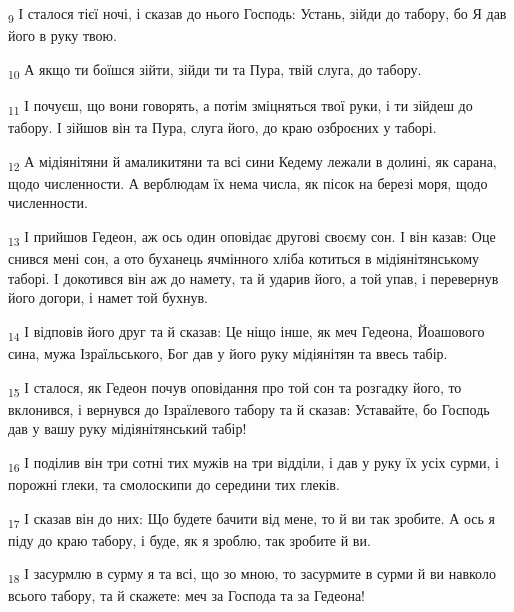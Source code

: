 \begin{tcolorbox}
\textsubscript{9} І сталося тієї ночі, і сказав до нього Господь: Устань, зійди до табору, бо Я дав його в руку твою.
\end{tcolorbox}
\begin{tcolorbox}
\textsubscript{10} А якщо ти боїшся зійти, зійди ти та Пура, твій слуга, до табору.
\end{tcolorbox}
\begin{tcolorbox}
\textsubscript{11} І почуєш, що вони говорять, а потім зміцняться твої руки, і ти зійдеш до табору. І зійшов він та Пура, слуга його, до краю озброєних у таборі.
\end{tcolorbox}
\begin{tcolorbox}
\textsubscript{12} А мідіянітяни й амаликитяни та всі сини Кедему лежали в долині, як сарана, щодо численности. А верблюдам їх нема числа, як пісок на березі моря, щодо численности.
\end{tcolorbox}
\begin{tcolorbox}
\textsubscript{13} І прийшов Гедеон, аж ось один оповідає другові своєму сон. І він казав: Оце снився мені сон, а ото буханець ячмінного хліба котиться в мідіянітянському таборі. І докотився він аж до намету, та й ударив його, а той упав, і перевернув його догори, і намет той бухнув.
\end{tcolorbox}
\begin{tcolorbox}
\textsubscript{14} І відповів його друг та й сказав: Це ніщо інше, як меч Гедеона, Йоашового сина, мужа Ізраїльського, Бог дав у його руку мідіянітян та ввесь табір.
\end{tcolorbox}
\begin{tcolorbox}
\textsubscript{15} І сталося, як Гедеон почув оповідання про той сон та розгадку його, то вклонився, і вернувся до Ізраїлевого табору та й сказав: Уставайте, бо Господь дав у вашу руку мідіянітянський табір!
\end{tcolorbox}
\begin{tcolorbox}
\textsubscript{16} І поділив він три сотні тих мужів на три відділи, і дав у руку їх усіх сурми, і порожні глеки, та смолоскипи до середини тих глеків.
\end{tcolorbox}
\begin{tcolorbox}
\textsubscript{17} І сказав він до них: Що будете бачити від мене, то й ви так зробите. А ось я піду до краю табору, і буде, як я зроблю, так зробите й ви.
\end{tcolorbox}
\begin{tcolorbox}
\textsubscript{18} І засурмлю в сурму я та всі, що зо мною, то засурмите в сурми й ви навколо всього табору, та й скажете: меч за Господа та за Гедеона!
\end{tcolorbox}
